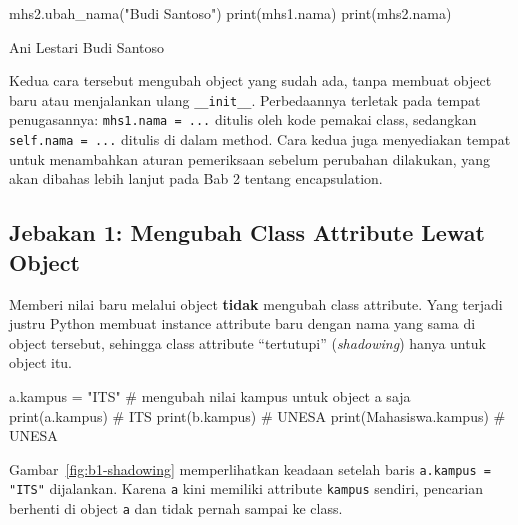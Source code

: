 \begin{kode}
mhs2.ubah_nama("Budi Santoso")
print(mhs1.nama)
print(mhs2.nama)
\end{kode}

\begin{keluaran}
Ani Lestari
Budi Santoso
\end{keluaran}

Kedua cara tersebut mengubah object yang sudah ada, tanpa membuat object baru atau menjalankan ulang \texttt{\_\_init\_\_}. Perbedaannya terletak pada tempat penugasannya: \texttt{mhs1.nama = ...} ditulis oleh kode pemakai class, sedangkan \texttt{self.nama = ...} ditulis di dalam method. Cara kedua juga menyediakan tempat untuk menambahkan aturan pemeriksaan sebelum perubahan dilakukan, yang akan dibahas lebih lanjut pada Bab 2 tentang encapsulation.

\subsection{Jebakan 1: Mengubah Class Attribute Lewat Object}

Memberi nilai baru melalui object \textbf{tidak} mengubah class attribute. Yang terjadi justru Python membuat instance attribute baru dengan nama yang sama di object tersebut, sehingga class attribute ``tertutupi'' (\emph{shadowing}) hanya untuk object itu.

\begin{kode}
a.kampus = "ITS"           # mengubah nilai kampus untuk object a saja
print(a.kampus)            # ITS
print(b.kampus)            # UNESA
print(Mahasiswa.kampus)    # UNESA
\end{kode}

Gambar~\ref{fig:b1-shadowing} memperlihatkan keadaan setelah baris \texttt{a.kampus = "ITS"} dijalankan. Karena \texttt{a} kini memiliki attribute \texttt{kampus} sendiri, pencarian berhenti di object \texttt{a} dan tidak pernah sampai ke class.

